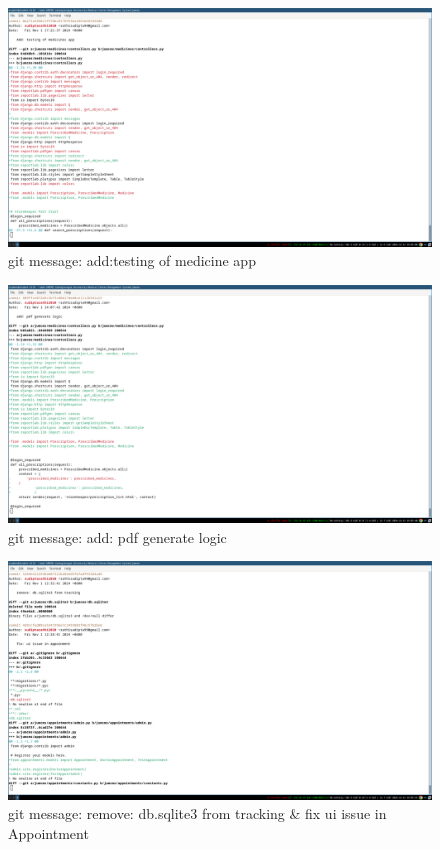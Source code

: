 \documentclass[a4paper,12pt]{article}
\begin{document}
\begin{figure}[H]
    \centering
    \includegraphics[width=\textwidth]{images/spr1meet33.png}
    \caption{git message: add:testing of medicine app}
\end{figure}


\begin{figure}[H]
    \centering
    \includegraphics[width=\textwidth]{images/spr1meet34.png}
    \caption{git message: add: pdf generate logic}
\end{figure}


\begin{figure}[H]
    \centering
    \includegraphics[width=\textwidth]{images/spr1meet35.png}
    \caption{git message: remove: db.sqlite3 from tracking \& fix ui issue in Appointment}
\end{figure}
\end{document}
